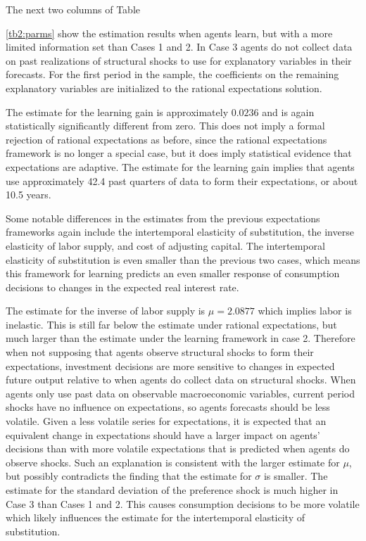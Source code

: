 The next two columns of Table {\ref{tb2:parms} show the estimation results when agents learn, but with a more limited information set than Cases 1 and 2.  In Case 3 agents do not collect data on past realizations of structural shocks to use for explanatory variables in their forecasts.  For the first period in the sample, the coefficients on the remaining explanatory variables are initialized to the rational expectations solution.

The estimate for the learning gain is approximately $0.0236$ and is again statistically significantly different from zero.  This does not imply a formal rejection of rational expectations as before, since the rational expectations framework is no longer a special case, but it does imply statistical evidence that expectations are adaptive.  The estimate for the learning gain implies that agents use approximately 42.4 past quarters of data to form their expectations, or about 10.5 years. 

Some notable differences in the estimates from the previous expectations frameworks again include the intertemporal elasticity of substitution, the inverse elasticity of labor supply, and cost of adjusting capital.  The intertemporal elasticity of substitution is even smaller than the previous two cases, which means this framework for learning predicts an even smaller response of consumption decisions to changes in the expected real interest rate.  

The estimate for the inverse of labor supply is $\mu=2.0877$ which implies labor is inelastic.  This is still far below the estimate under rational expectations, but much larger than the estimate under the learning framework in case 2.  Therefore when not supposing that agents observe structural shocks to form their expectations, investment decisions are more sensitive to changes in expected future output relative to when agents do collect data on structural shocks.  When agents only use past data on observable macroeconomic variables, current period shocks have no influence on expectations, so agents forecasts should be less volatile.  Given a less volatile series for expectations, it is expected that an equivalent change in expectations should have a larger impact on agents' decisions than with more volatile expectations that is predicted when agents do observe shocks.  Such an explanation is consistent with the larger estimate for $\mu$, but possibly contradicts the finding that the estimate for $\sigma$ is smaller.  The estimate for the standard deviation of the preference shock is much higher in Case 3 than Cases 1 and 2.  This causes consumption decisions to be more volatile which likely influences the estimate for the intertemporal elasticity of substitution.

}
